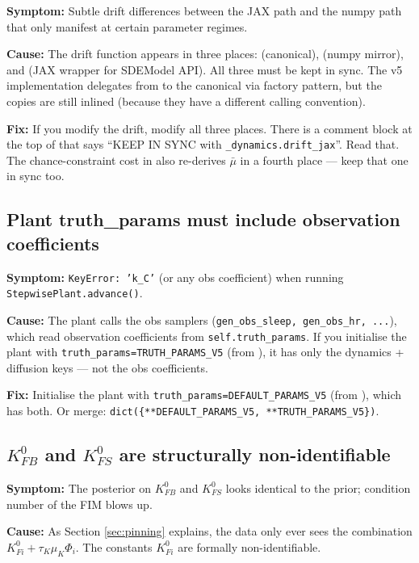 \documentclass[11pt,a4paper]{article}
\theoremstyle{definition}
\begin{document}
\textbf{Symptom:} Subtle drift differences between the JAX path and
the numpy path that only manifest at certain parameter regimes.

\textbf{Cause:} The drift function appears in three places:
 (canonical), 
(numpy mirror), and  (JAX wrapper for
SDEModel API). All three must be kept in sync. The v5 implementation
delegates from  to the canonical
 via factory pattern, but the
 copies are still inlined (because they have a
different calling convention).

\textbf{Fix:} If you modify the drift, modify all three places. There
is a comment block at the top of  that says
``KEEP IN SYNC with \texttt{\_dynamics.drift\_jax}''. Read that. The
chance-constraint cost in  also re-derives
$\bar\mu$ in a fourth place --- keep that one in sync too.

\subsection{Plant truth\_params must include observation coefficients}

\textbf{Symptom:} \texttt{KeyError: 'k\_C'} (or any obs coefficient)
when running \texttt{StepwisePlant.advance()}.

\textbf{Cause:} The plant calls the obs samplers
(\texttt{gen\_obs\_sleep, gen\_obs\_hr, ...}), which read observation
coefficients from \texttt{self.truth\_params}. If you initialise the
plant with \texttt{truth\_params=TRUTH\_PARAMS\_V5} (from
), it has only the dynamics + diffusion keys ---
not the obs coefficients.

\textbf{Fix:} Initialise the plant with
\texttt{truth\_params=DEFAULT\_PARAMS\_V5} (from ),
which has both. Or merge: \texttt{dict(\{**DEFAULT\_PARAMS\_V5,
**TRUTH\_PARAMS\_V5\})}.

\subsection{$K_{FB}^0$ and $K_{FS}^0$ are structurally non-identifiable}

\textbf{Symptom:} The posterior on $K_{FB}^0$ and $K_{FS}^0$ looks
identical to the prior; condition number of the FIM blows up.

\textbf{Cause:} As Section \ref{sec:pinning} explains, the data only
ever sees the combination $K_{Fi}^0 + \tau_K \mu_K \Phi_i$. The
constants $K_{Fi}^0$ are formally non-identifiable.
\end{document}
